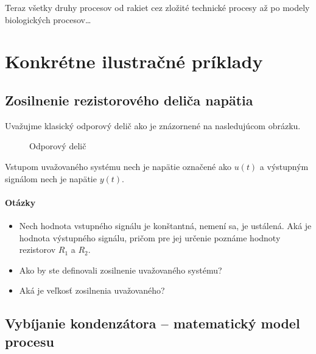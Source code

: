 \documentclass[a4paper, 10pt, ]{article}
\begin{document}
Teraz všetky druhy procesov od rakiet cez zložité technické procesy až po modely biologických procesov\ldots











\section{Konkrétne ilustračné príklady}



\subsection{Zosilnenie rezistorového deliča napätia}
\label{zrdn}


Uvažujme klasický odporový delič ako je znázornené na nasledujúcom obrázku.


\begin{figure}[!h]
	\centering

	\makebox[\textwidth][c]{%
	
	}

	\caption{Odporový delič}
	\label{OdporovyDelic}
\end{figure}



Vstupom uvažovaného systému nech je napätie označené ako $u(t)$ a výstupným signálom nech je napätie $y(t)$.


\paragraph{Otázky}
\begin{itemize}[leftmargin=0pt, labelsep=4mm, itemsep=0pt]

	\item Nech hodnota vstupného signálu je konštantná, nemení sa, je ustálená. Aká je hodnota výstupného signálu, pričom pre jej určenie poznáme hodnoty rezistorov $R_1$ a $R_2$.

    \item Ako by ste definovali zosilnenie uvažovaného systému?

    \item Aká je veľkosť zosilnenia uvažovaného?

\end{itemize}



\subsection{Vybíjanie kondenzátora -- matematický model procesu}
\label{castVybij}
\end{document}
